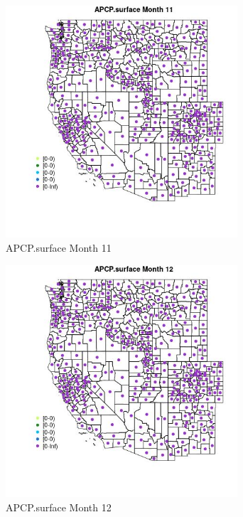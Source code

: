 \begin{figure} 
\centering  
\includegraphics[width=0.77\textwidth]{Code_Outputs/df_report_ML_predictors_CountyCentroid_Locations_Dates_2008-01-01to2018-12-31_MapObsMo11APCPsurface.jpg} 
\caption{\label{fig:df_report_ML_predictors_CountyCentroid_Locations_Dates_2008-01-01to2018-12-31MapObsMo11APCPsurface}APCP.surface Month 11} 
\end{figure} 
 

\begin{figure} 
\centering  
\includegraphics[width=0.77\textwidth]{Code_Outputs/df_report_ML_predictors_CountyCentroid_Locations_Dates_2008-01-01to2018-12-31_MapObsMo12APCPsurface.jpg} 
\caption{\label{fig:df_report_ML_predictors_CountyCentroid_Locations_Dates_2008-01-01to2018-12-31MapObsMo12APCPsurface}APCP.surface Month 12} 
\end{figure} 
 

